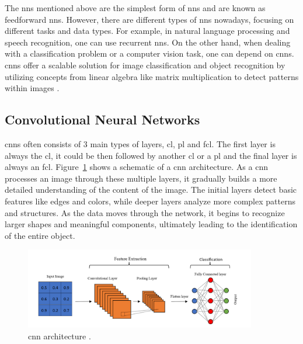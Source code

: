 The \gls{nn}s mentioned above are the simplest form of \gls{nn}s and are known as feedforward \gls{nn}s. However, there are different types of \gls{nn}s nowadays, focusing on different tasks and data types. For example,  in natural language processing and speech recognition, one can use recurrent \gls{nn}s. On the other hand, when dealing with a classification problem or a computer vision task, one can depend on \gls{cnn}s. \gls{cnn}s offer a scalable solution for image classification and object recognition by utilizing concepts from linear algebra like matrix multiplication to detect patterns within images \cite{ibm_cnn}.

\subsection{Convolutional Neural Networks}
\gls{cnn}s often consists of 3 main types of layers, \gls{cl}, \gls{pl} and \gls{fcl}. The first layer is always the \gls{cl}, it could be then followed by another \gls{cl} or a \gls{pl} and the final layer is always an \gls{fcl}. Figure~\ref{full_cnn} shows a schematic of a \gls{cnn} architecture. As a \gls{cnn} processes an image through these multiple layers, it gradually builds a more detailed understanding of the content of the image. The initial layers detect basic features like edges and colors, while deeper layers analyze more complex patterns and structures. As the data moves through the network, it begins to recognize larger shapes and meaningful components, ultimately leading to the identification of the entire object.

\begin{figure}[ht]
    \centering
    \includegraphics[width=0.9\textwidth]{Figures/Full_cnn.PNG} 
    \caption{\gls{cnn} architecture \cite{Full_CNN}.}
    \label{full_cnn}
\end{figure}

